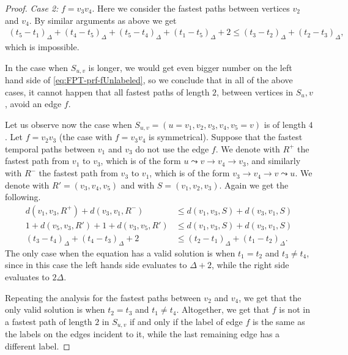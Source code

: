 \documentclass[a4paper,UKenglish,cleveref, autoref, thm-restate]{lipics-v2021}
\begin{document}
\begin{proof}
    \emph{Case 2: }$f = v_3v_4$.
    Here we consider the fastest paths between vertices $v_{2}$ and $v_{4}$.
    By similar arguments as above we get
    \begin{align*}
        (t_5 - t_1)_\Delta + (t_4 - t_5)_\Delta + (t_5 - t_4)_\Delta + (t_1 - t_5)_\Delta + 2 \leq (t_3 - t_2)_\Delta + (t_2 - t_3)_\Delta,
    \end{align*}
    which is impossible.
    
    In the case when $S_{u,v}$ is longer, we would get even bigger number on the left hand side of \cref{eq:FPT-prf-fUnlabeled}, 
    so we conclude that in all of the above cases, it cannot happen that all fastest paths of length $2$, between vertices in $S{_u,v}$, avoid an edge $f$.

    Let us observe now the case when $S_{u,v} = (u=v_1,v_2, v_3, v_4, v_5=v)$ is of length $4$.
    Let $f = v_2 v_3$ (the case with $f = v_3 v_4$ is symmetrical).
    Suppose that the fastest temporal paths between $v_1$ and $v_3$ do not use the edge $f$.
    We denote with $R^+$ the fastest path from $v_1$ to $v_3$, 
    which is of the form $u \leadsto v \rightarrow v_4 \rightarrow v_3$,
    and similarly 
    with $R^-$ the fastest path from $v_3$ to $v_1$, which is
    of the form $v_3 \rightarrow v_4 \rightarrow v \leadsto u$.
    We denote with $R' = (v_3, v_4, v_5)$ and with $S = (v_1,v_2,v_3)$.
    Again we get the following.
    \begin{equation*}
    \begin{split}
        d(v_{1}, v_{3}, R^+) + d(v_{3}, v_{1}, R^-) &\leq 
        d(v_{1}, v_{3}, S) + d(v_{3}, v_{1}, S) \\
        1 + d(v_5,v_3,R') + 1 + d(v_3,v_5,R') &\leq d(v_{1}, v_{3}, S) + d(v_{3}, v_{1}, S) \\
        (t_3 - t_4)_\Delta + (t_4 - t_3)_\Delta + 2 
        &\leq 
        (t_2 - t_1)_\Delta + (t_1 - t_2)_\Delta.        
    \end{split}
    \end{equation*}
    The only case when the equation has a valid solution is when $t_1 = t_2$ and $t_3 \neq t_4$,
    since in this case the left hands side evaluates to $\Delta + 2$, while the right side evaluates to $2 \Delta$.
    
    Repeating the analysis for the fastest paths between $v_2$ and $v_4$,
    we get that the only valid solution is when $t_2 = t_3$ and $t_1 \neq t_4$.
    Altogether, we get that $f$ is not in a fastest path of length $2$ in $S_{u,v}$ if and only if the label of edge $f$ is the same as the labels on the edges incident to it, while the last remaining edge has a different label.
\end{proof}
\end{document}
